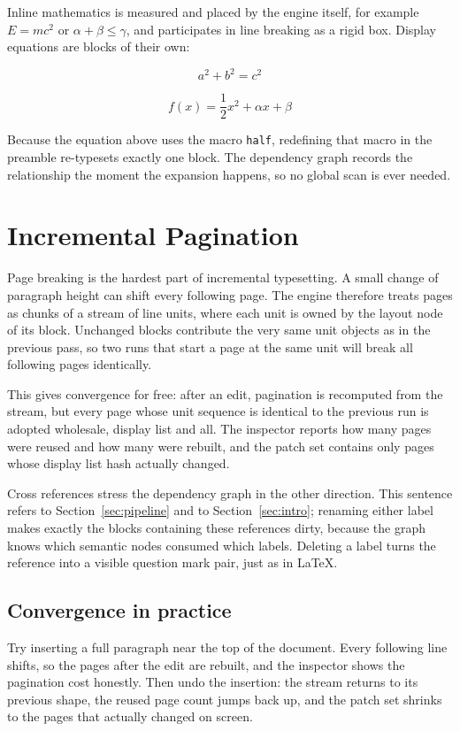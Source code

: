 \documentclass{article}
\newcommand{\half}{\frac{1}{2}}
\begin{document}
Inline mathematics is measured and placed by the engine itself, for
example $E = mc^2$ or $\alpha + \beta \le \gamma$, and participates in
line breaking as a rigid box. Display equations are blocks of their
own:

\[
a^2 + b^2 = c^2
\]

\[
f(x) = \half x^2 + \alpha x + \beta
\]

Because the equation above uses the macro \texttt{half}, redefining
that macro in the preamble re-typesets exactly one block. The
dependency graph records the relationship the moment the expansion
happens, so no global scan is ever needed.

\section{Incremental Pagination}
\label{sec:pages}

Page breaking is the hardest part of incremental typesetting. A small
change of paragraph height can shift every following page. The engine
therefore treats pages as chunks of a stream of line units, where each
unit is owned by the layout node of its block. Unchanged blocks
contribute the very same unit objects as in the previous pass, so two
runs that start a page at the same unit will break all following
pages identically.

This gives convergence for free: after an edit, pagination is
recomputed from the stream, but every page whose unit sequence is
identical to the previous run is adopted wholesale, display list and
all. The inspector reports how many pages were reused and how many
were rebuilt, and the patch set contains only pages whose display
list hash actually changed.

Cross references stress the dependency graph in the other direction.
This sentence refers to Section~\ref{sec:pipeline} and to
Section~\ref{sec:intro}; renaming either label makes exactly the
blocks containing these references dirty, because the graph knows
which semantic nodes consumed which labels. Deleting a label turns
the reference into a visible question mark pair, just as in LaTeX.

\subsection{Convergence in practice}
\label{sec:convergence}

Try inserting a full paragraph near the top of the document. Every
following line shifts, so the pages after the edit are rebuilt, and
the inspector shows the pagination cost honestly. Then undo the
insertion: the stream returns to its previous shape, the reused page
count jumps back up, and the patch set shrinks to the pages that
actually changed on screen.
\end{document}

